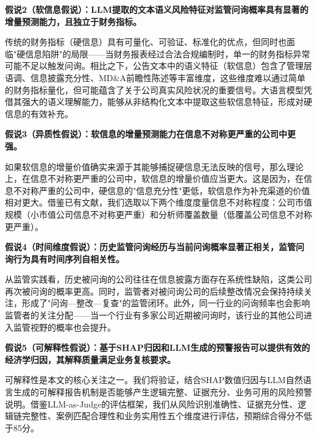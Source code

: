 \textbf{假说2（软信息假说）：LLM提取的文本语义风险特征对监管问询概率具有显著的增量预测能力，且独立于财务指标。}

传统的财务指标（硬信息）具有可量化、可验证、标准化的优点，但同时也面临"硬信息陷阱"的局限——当财务报表经过合法合规编制时，单一的财务指标异常可能不足以触发问询。相比之下，公告文本中的语义特征（软信息）包含了管理层语调、信息披露充分性、MD\&A前瞻性陈述等丰富维度，这些维度难以通过简单的财务指标量化，但可能蕴含了关于公司真实风险状况的重要信号。大语言模型凭借其强大的语义理解能力，能够从非结构化文本中提取这些软信息特征，形成对硬信息的有效补充。

\textbf{假说3（异质性假说）：软信息的增量预测能力在信息不对称更严重的公司中更强。}

如果软信息的增量价值确实来源于其能够捕捉硬信息无法反映的信号，那么理论上，在信息不对称更严重的公司中，软信息的增量价值应当更大。这是因为，在信息不对称严重的公司中，硬信息的"信息充分性"更低，软信息作为补充渠道的价值相对更大。借鉴已有文献，我们选取以下两个维度度量信息不对称程度：公司市值规模（小市值公司信息不对称更严重）和分析师覆盖数量（低覆盖公司信息不对称更严重）。

\textbf{假说4（时间维度假说）：历史监管问询经历与当前问询概率显著正相关，监管问询行为具有时间序列自相关性。}

从监管实践看，历史被问询的公司往往在信息披露方面存在系统性缺陷，这类公司再次被问询的概率更高。同时，监管者对被问询公司的后续整改情况会保持持续关注，形成了"问询—整改—复查"的监管闭环。此外，同一行业的问询频率也会影响监管者的关注分配——当一个行业有多家公司近期被问询时，该行业的其他公司进入监管视野的概率也会提升。

\textbf{假说5（可解释性假说）：基于SHAP归因和LLM生成的预警报告可以提供有效的经济学归因，其解释质量满足业务复核要求。}

可解释性是本文的核心关注之一。我们将验证，结合SHAP数值归因与LLM自然语言生成的可解释报告机制是否能够产生逻辑完整、证据充分、业务可用的风险预警说明。借鉴LLM-as-Judge的评估框架\citep{zheng2024judge}，我们从风险识别准确性、证据充分性、逻辑链完整性、案例匹配合理性和业务实用性五个维度进行评估，预期综合得分不低于85分。
